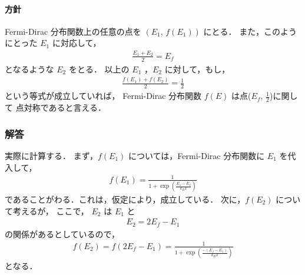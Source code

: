             \paragraph*{方針}
            Fermi-Dirac 分布関数上の任意の点を $(E_{1},\,f(E_{1}))$ にとる．
            また，このようにとった $E_{1}$ に対応して，
            \begin{align*}
            \frac{E_{1}+E_{2}}{2}=E_{f}
            \end{align*}
            となるような $E_{2}$ をとる．
            以上の $E_{1}$ ，$E_{2}$ に対して，もし，
            \begin{align*}
            \frac{f(E_{1})+f(E_{2})}{2}=\frac{1}{2}
            \end{align*}
            という等式が成立していれば，
            Fermi-Dirac 分布関数
            $f(E)$ は点($E_{f}$, $\displaystyle\frac{1}{2}$)に関して
            点対称であると言える．

            \subsubsection*{解答}
                実際に計算する．
                まず，$f(E_{1})$ については，Fermi-Dirac 分布関数に $E_{1}$ を代入して，
                \begin{align}\label{1}
                f(E_{1})=\frac{1}{1+\exp\left(\frac{E_{1}-E_{f}}{k_{B}T}\right)}
                \end{align}
                であることがわる．これは，仮定により，成立している．
                次に，$f(E_{2})$ について考えるが，
                ここで， $E_{2}$ は $E_{1}$ と
                \begin{align*}
                E_{2}=2E_{f}-E_{1}
                \end{align*}
                の関係があるとしているので，
                \begin{align}\label{2}
                f(E_{2})=f(2E_{f}-E_{1})=\frac{1}{1+\exp\left(\frac{-(E_{f}-E_{1})}{k_{B}T}\right)}
                \end{align}
                となる．

